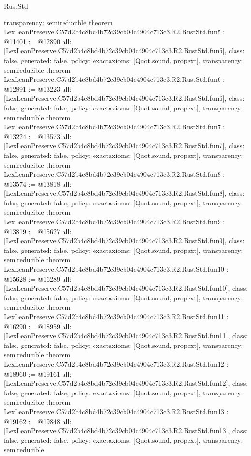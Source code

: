 \begin{lexlean}{RustStd}
\begin{coremodule}
{  transparency: semireducible
}
theorem LexLeanPreserve.C57d2b4c8bd4b72c39cb04c4904c713c3.R2.RustStd.fun5 : @11401 := @12890 {
  all: [LexLeanPreserve.C57d2b4c8bd4b72c39cb04c4904c713c3.R2.RustStd.fun5],
  class: false,
  generated: false,
  policy: exact{axioms: [Quot.sound, propext]},
  transparency: semireducible
}
theorem LexLeanPreserve.C57d2b4c8bd4b72c39cb04c4904c713c3.R2.RustStd.fun6 : @12891 := @13223 {
  all: [LexLeanPreserve.C57d2b4c8bd4b72c39cb04c4904c713c3.R2.RustStd.fun6],
  class: false,
  generated: false,
  policy: exact{axioms: [Quot.sound, propext]},
  transparency: semireducible
}
theorem LexLeanPreserve.C57d2b4c8bd4b72c39cb04c4904c713c3.R2.RustStd.fun7 : @13224 := @13573 {
  all: [LexLeanPreserve.C57d2b4c8bd4b72c39cb04c4904c713c3.R2.RustStd.fun7],
  class: false,
  generated: false,
  policy: exact{axioms: [Quot.sound, propext]},
  transparency: semireducible
}
theorem LexLeanPreserve.C57d2b4c8bd4b72c39cb04c4904c713c3.R2.RustStd.fun8 : @13574 := @13818 {
  all: [LexLeanPreserve.C57d2b4c8bd4b72c39cb04c4904c713c3.R2.RustStd.fun8],
  class: false,
  generated: false,
  policy: exact{axioms: [Quot.sound, propext]},
  transparency: semireducible
}
theorem LexLeanPreserve.C57d2b4c8bd4b72c39cb04c4904c713c3.R2.RustStd.fun9 : @13819 := @15627 {
  all: [LexLeanPreserve.C57d2b4c8bd4b72c39cb04c4904c713c3.R2.RustStd.fun9],
  class: false,
  generated: false,
  policy: exact{axioms: [Quot.sound, propext]},
  transparency: semireducible
}
theorem LexLeanPreserve.C57d2b4c8bd4b72c39cb04c4904c713c3.R2.RustStd.fun10 : @15628 := @16289 {
  all: [LexLeanPreserve.C57d2b4c8bd4b72c39cb04c4904c713c3.R2.RustStd.fun10],
  class: false,
  generated: false,
  policy: exact{axioms: [Quot.sound, propext]},
  transparency: semireducible
}
theorem LexLeanPreserve.C57d2b4c8bd4b72c39cb04c4904c713c3.R2.RustStd.fun11 : @16290 := @18959 {
  all: [LexLeanPreserve.C57d2b4c8bd4b72c39cb04c4904c713c3.R2.RustStd.fun11],
  class: false,
  generated: false,
  policy: exact{axioms: [Quot.sound, propext]},
  transparency: semireducible
}
theorem LexLeanPreserve.C57d2b4c8bd4b72c39cb04c4904c713c3.R2.RustStd.fun12 : @18960 := @19161 {
  all: [LexLeanPreserve.C57d2b4c8bd4b72c39cb04c4904c713c3.R2.RustStd.fun12],
  class: false,
  generated: false,
  policy: exact{axioms: [Quot.sound, propext]},
  transparency: semireducible
}
theorem LexLeanPreserve.C57d2b4c8bd4b72c39cb04c4904c713c3.R2.RustStd.fun13 : @19162 := @19848 {
  all: [LexLeanPreserve.C57d2b4c8bd4b72c39cb04c4904c713c3.R2.RustStd.fun13],
  class: false,
  generated: false,
  policy: exact{axioms: [Quot.sound, propext]},
  transparency: semireducible
}
\end{coremodule}
\end{lexlean}
